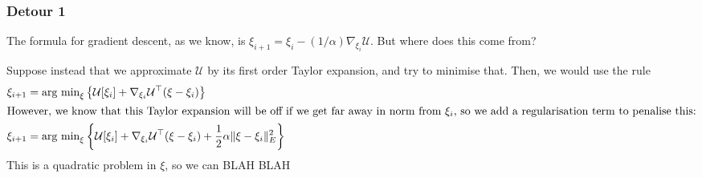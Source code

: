 \documentclass[twoside]{article}
\newcommand{\cu}{\mathcal{U}}
\begin{document}
\subsubsection{Detour 1}
\label{sec:detour-1-1}

The formula for gradient descent, as we know, is $\xi_{i+1} = \xi_i - (1/\alpha)\nabla_{\xi_i}\cu$. But where does this come from?

Suppose instead that we approximate $\cu$ by its first order Taylor expansion, and try to minimise that. Then, we would use the rule
\begin{align}
  \label{eq:6}
  \xi_{i+1} &= \text{arg min}_{\xi} \left\{ \cu[\xi_i] + \nabla_{\xi_i}\cu^{\top} (\xi - \xi_i)\right\}\\
  \intertext{However, we know that this Taylor expansion will be off if we get far away in norm from $\xi_i$, so we add a regularisation term to penalise this:}
    \xi_{i+1} &= \text{arg min}_{\xi} \left\{ \cu[\xi_i] + \nabla_{\xi_i}\cu^{\top} (\xi - \xi_i) + \frac{1}{2} \alpha \|\xi - \xi_i \|_E^2 \right\}\label{eq:7}
\end{align}
This is a quadratic problem in $\xi$, so we can BLAH BLAH
\end{document}
